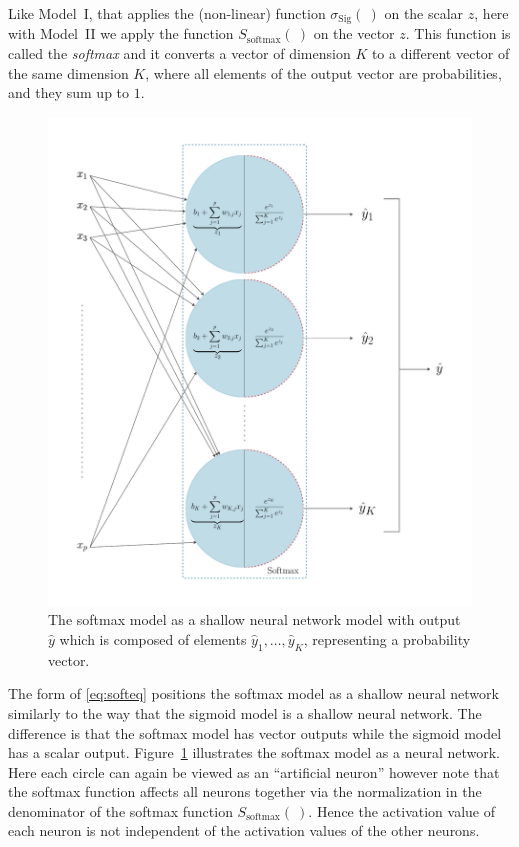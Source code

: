 \documentclass[12pt]{article}
\newcommand{\sbmc}[1]{{\color{cyan}#1}}
\begin{document}
Like Model~I, that applies the (non-linear) function $\sigma_{\text{Sig}}(~)$ on the scalar $z$, here with Model~II we apply the function $S_{\textrm{softmax}}(~)$ on the vector $z$. This function is called the {\em softmax} and it converts a vector of dimension $K$ to a different vector of the same dimension $K$, where all elements of the output vector are probabilities, and they sum up to $1$.

\begin{figure}[h]
\begin{center}
\includegraphics[scale=0.48,trim=50 50 50 50, clip]{figures/figure_softmax.pdf}%
\end{center}
\caption{The softmax model as a shallow neural network model with output $\hat{y}$ which is composed of elements $\hat{y}_1, \ldots, \hat{y}_K$,  representing a probability vector. }
\label{fig:shalsoft}
\end{figure}

The form of \eqref{eq:softeq} positions the softmax model as a shallow neural network similarly to the way that the sigmoid model is a shallow neural network. The difference is that the softmax model has vector outputs while the sigmoid model has a scalar output. Figure~\ref{fig:shalsoft} illustrates the softmax model as a neural network. Here each circle can again be viewed as an ``artificial neuron'' however note that the softmax function %
affects all neurons together via the normalization in the denominator of the softmax function $S_{\textrm{softmax}}(~)$. Hence the activation value of each neuron is not independent of the activation values of the other neurons.
\end{document}
